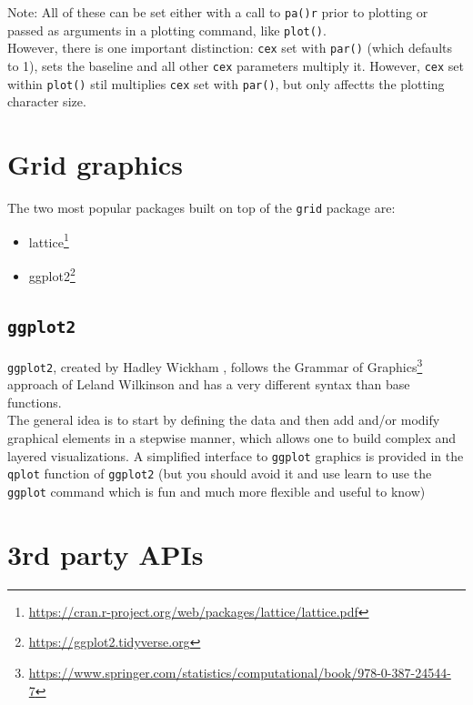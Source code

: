 \documentclass[
]{book}
\DeclareRobustCommand{\href}[2]{#2\footnote{\url{#1}}}
\providecommand{\tightlist}{%
  \setlength{\itemsep}{0pt}\setlength{\parskip}{0pt}}
\renewcommand{\href}[2]{#2\footnote{\url{#1}}}
\begin{document}
Note: All of these can be set either with a call to \texttt{pa()r} prior to plotting or passed as arguments in a plotting command, like \texttt{plot()}.\\
However, there is one important distinction: \texttt{cex} set with \texttt{par()} (which defaults to 1), sets the baseline and all other \texttt{cex} parameters multiply it. However, \texttt{cex} set within \texttt{plot()} stil multiplies \texttt{cex} set with \texttt{par()}, but only affectts the plotting character size.

\hypertarget{grid-graphics}{%
\section{Grid graphics}\label{grid-graphics}}

The two most popular packages built on top of the \texttt{grid} package are:

\begin{itemize}
\tightlist
\item
  \href{https://cran.r-project.org/web/packages/lattice/lattice.pdf}{lattice}
\item
  \href{https://ggplot2.tidyverse.org}{ggplot2} \citep{wickham2011ggplot2}
\end{itemize}

\hypertarget{ggplot2}{%
\subsection{\texorpdfstring{\texttt{ggplot2}}{ggplot2}}\label{ggplot2}}

\texttt{ggplot2}, created by Hadley Wickham \citep{wickham2011ggplot2}, follows the \href{https://www.springer.com/statistics/computational/book/978-0-387-24544-7}{Grammar of Graphics} approach of Leland Wilkinson \citep{wilkinson2012grammar} and has a very different syntax than base functions.\\
The general idea is to start by defining the data and then add and/or modify graphical elements in a stepwise manner, which allows one to build complex and layered visualizations. A simplified interface to \texttt{ggplot} graphics is provided in the \texttt{qplot} function of \texttt{ggplot2} (but you should avoid it and use learn to use the \texttt{ggplot} command which is fun and much more flexible and useful to know)

\hypertarget{rd-party-apis}{%
\section{3rd party APIs}\label{rd-party-apis}}
\end{document}
